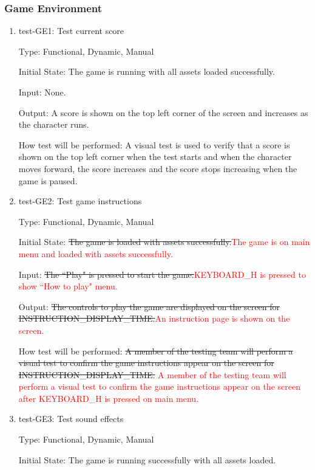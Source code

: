 \documentclass[12pt, titlepage]{article}
\begin{document}
\subsubsection{Game Environment}
\begin{enumerate}
\item{test-GE1: Test current score\\}

Type: Functional, Dynamic, Manual
					
Initial State: The game is running with all assets loaded successfully.
					
Input: None.
					
Output: A score is shown on the top left corner of the screen and increases as the character runs.
					
How test will be performed: A visual test is used to verify that a score is shown on the top left corner when the test starts and when the character moves forward, the score increases and the score stops increasing when the game is paused.

\item{test-GE2: Test game instructions\\}

Type: Functional, Dynamic, Manual
					
Initial State: \sout{The game is loaded with assets successfully.}\textcolor{red}{The game is on main menu and loaded with assets successfully. } 
					
Input: \sout{The ``Play" is pressed to start the game.}\textcolor{red}{KEYBOARD\_H is pressed to show ``How to play" menu.}
					
Output: \sout{The controls to play the game are displayed on the screen for INSTRUCTION\_DISPLAY\_TIME.}\textcolor{red}{An instruction page is shown on the screen.}
					
How test will be performed: \sout{A member of the testing team will perform a visual test to confirm the game instructions appear on the screen for INSTRUCTION\_DISPLAY\_TIME.}\textcolor{red}{ A member of the testing team will perform a visual test to confirm the game instructions appear on the screen after KEYBOARD\_H is pressed on main menu.}

\item{test-GE3: Test sound effects\\}

Type: Functional, Dynamic, Manual
					
Initial State: The game is running successfully with all assets loaded.
					

\end{enumerate}
\end{document}
